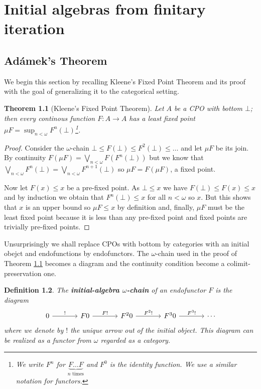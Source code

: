 \documentclass[letterpaper, 11pt, oneside]{memoir}
\theoremstyle{myteo}
\newtheorem{theorem}{Theorem}[section]
\newtheorem{definition}[theorem]{Definition}
\numberwithin{equation}{section}
\newcommand{\marginnote}[1]{\marginpar{\footnotesize #1}}
\begin{document}
\chapter{Initial algebras from finitary iteration}
\newpage

\section{Adámek's Theorem}

We begin this section by recalling Kleene's Fixed Point Theorem and its proof with the goal of generalizing it to the categorical setting.

\begin{theorem}[Kleene's Fixed Point Theorem]
  \label{teo:kleene}
  Let \(A\) be a CPO with bottom \(\bot\); then every continous function \(F \colon A \to A\) has a least fixed point \(\mu F = \sup_{n < \omega}F^n(\bot)\)\footnote{We write \(F^n\) for \(\underbrace{F \ldots F}_{n \text{ times}}\) and \(F^0\) is the identity function. We use a similar notation for functors.}.
\end{theorem}

\begin{proof}
  Consider the \(\omega\)-chain \(\bot \leq F(\bot) \leq F^2(\bot) \leq \ldots\) and let \(\mu F\) be its join.
  By continuity \(F(\mu F) = \bigvee_{n < \omega}F(F^n(\bot))\) but we know that \(\bigvee_{n < \omega}F^n(\bot) = \bigvee_{n < \omega}F^{n+1}(\bot)\) so \(\mu F = F(\mu F)\), a fixed point.

  Now let \(F(x) \leq x\) be a pre-fixed point.
  As \(\bot \leq x\) we have \(F(\bot) \leq F(x) \leq x\) and by induction we obtain that \(F^n(\bot) \leq x\) for all \(n < \omega\) so \(x\).
  But this shows that \(x\) is an upper bound so \(\mu F \leq x\) by definition and, finally, \(\mu F\) must be the least fixed point because it is less than any pre-fixed point and fixed points are trivially pre-fixed points.
\end{proof}

Unsurprisingly we shall replace CPOs with bottom by categories with an initial obejct and endofunctions by endofunctors.
The \(\omega\)-chain used in the proof of Theorem \ref{teo:kleene} becomes a diagram and the continuity condition become a colimit-preservation one.

\begin{definition}
  The \textbf{initial-algebra \(\omega\)-chain}\marginnote{initial-algebra \(\omega\)-chain} of an endofunctor \(F\) is the diagram
  \begin{equation}
    \label{dia:initial_chain}
    \begin{tikzcd}[sep = large]
      0 \ar[r, "!"] & F0 \ar[r, "F!"] & F^20 \ar[r, "F^2!"] & F^30 \ar[r, "F^3!"] & \cdots
    \end{tikzcd}
  \end{equation}
  where we denote by \(!\) the unique arrow out of the initial object.
  This diagram can be realized as a functor from \(\omega\) regarded as a category.
\end{definition}
\end{document}
